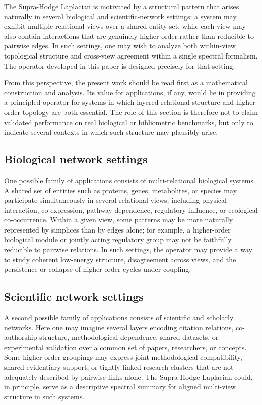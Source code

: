 \documentclass[11pt]{article}
\theoremstyle{definition}
\theoremstyle{remark}
\begin{document}
The Supra-Hodge Laplacian is motivated by a structural pattern that arises naturally in several biological and scientific-network settings: a system may exhibit multiple relational views over a shared entity set, while each view may also contain interactions that are genuinely higher-order rather than reducible to pairwise edges. In such settings, one may wish to analyze both within-view topological structure and cross-view agreement within a single spectral formalism. The operator developed in this paper is designed precisely for that setting.

From this perspective, the present work should be read first as a mathematical construction and analysis. Its value for applications, if any, would lie in providing a principled operator for systems in which layered relational structure and higher-order topology are both essential. The role of this section is therefore not to claim validated performance on real biological or bibliometric benchmarks, but only to indicate several contexts in which such structure may plausibly arise.

\subsection{Biological network settings}

One possible family of applications consists of multi-relational biological systems. A shared set of entities such as proteins, genes, metabolites, or species may participate simultaneously in several relational views, including physical interaction, co-expression, pathway dependence, regulatory influence, or ecological co-occurrence. Within a given view, some patterns may be more naturally represented by simplices than by edges alone; for example, a higher-order biological module or jointly acting regulatory group may not be faithfully reducible to pairwise relations. In such settings, the operator may provide a way to study coherent low-energy structure, disagreement across views, and the persistence or collapse of higher-order cycles under coupling.

\subsection{Scientific network settings}

A second possible family of applications consists of scientific and scholarly networks. Here one may imagine several layers encoding citation relations, co-authorship structure, methodological dependence, shared datasets, or experimental validation over a common set of papers, researchers, or concepts. Some higher-order groupings may express joint methodological compatibility, shared evidentiary support, or tightly linked research clusters that are not adequately described by pairwise links alone. The Supra-Hodge Laplacian could, in principle, serve as a descriptive spectral summary for aligned multi-view structure in such systems.
\end{document}
